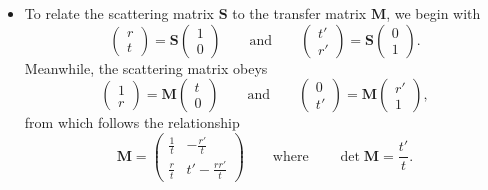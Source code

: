 \documentclass[11pt, a4paper]{article}
\newcommand{\mat}[1]{\mathbf{#1}}  %
\renewcommand{\SS}{\mat{S}}  %
\newcommand{\M}{\mat{M}}  %
\begin{document}
\begin{itemize}
    \item To relate the scattering matrix $ \SS $ to the transfer matrix $ \M $, we begin with
    \begin{equation*}
        \begin{pmatrix}
            r\\
            t
        \end{pmatrix} 
        = \SS
        \begin{pmatrix}
            1\\
            0
        \end{pmatrix}
        \qquad \text{and} \qquad 
        \begin{pmatrix}
            t'\\
            r'
        \end{pmatrix}
        = \SS
        \begin{pmatrix}
            0\\
            1
        \end{pmatrix}.
    \end{equation*}
    Meanwhile, the scattering matrix obeys 
    \begin{equation*}
        \begin{pmatrix}
            1 \\
            r
        \end{pmatrix}
        = \M
        \begin{pmatrix}
            t\\
            0
        \end{pmatrix}
        \qquad \text{and} \qquad 
        \begin{pmatrix}
            0\\
            t'
        \end{pmatrix}
        = \M
        \begin{pmatrix}
            r'\\
            1
        \end{pmatrix},
    \end{equation*}
    from which follows the relationship
    \begin{equation*}
        \M = 
        \begin{pmatrix}
            \frac{1}{t} & - \frac{r'}{t}\\
            \frac{r}{t} & t' - \frac{rr'}{t}
        \end{pmatrix}
        \qquad \text{where} \qquad \det \M = \frac{t'}{t}.
    \end{equation*}

\end{itemize}
\end{document}
